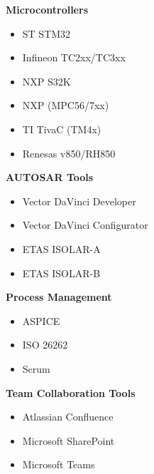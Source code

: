 \hfill
\begin{minipage}[t]{0.48\textwidth}
\textbf{Microcontrollers}
\begin{itemize}[leftmargin=*,noitemsep,topsep=0pt]
    \item ST STM32 
    \item Infineon TC2xx/TC3xx 
    \item NXP S32K 
    \item NXP (MPC56/7xx) 
    \item TI TivaC (TM4x) 
    \item Renesas v850/RH850 
\end{itemize}

\vspace{0.5em}

\textbf{AUTOSAR Tools}
\begin{itemize}[leftmargin=*,noitemsep,topsep=0pt]
    \item Vector DaVinci Developer 
    \item Vector DaVinci Configurator 
    \item ETAS ISOLAR-A 
    \item ETAS ISOLAR-B 
\end{itemize}

\vspace{0.5em}

\textbf{Process Management}
\begin{itemize}[leftmargin=*,noitemsep,topsep=0pt]
    \item ASPICE 
    \item ISO 26262 
    \item Scrum 
\end{itemize}

\vspace{0.5em}

\textbf{Team Collaboration Tools}
\begin{itemize}[leftmargin=*,noitemsep,topsep=0pt]
    \item Atlassian Confluence 
    \item Microsoft SharePoint 
    \item Microsoft Teams 
\end{itemize}

\vspace{0.5em}


\end{minipage}
